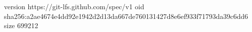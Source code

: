 version https://git-lfs.github.com/spec/v1
oid sha256:a2ae4674e4dd92e1942d2d13da667de760131427d8e6ef933f71793da39c6dd6
size 699212
